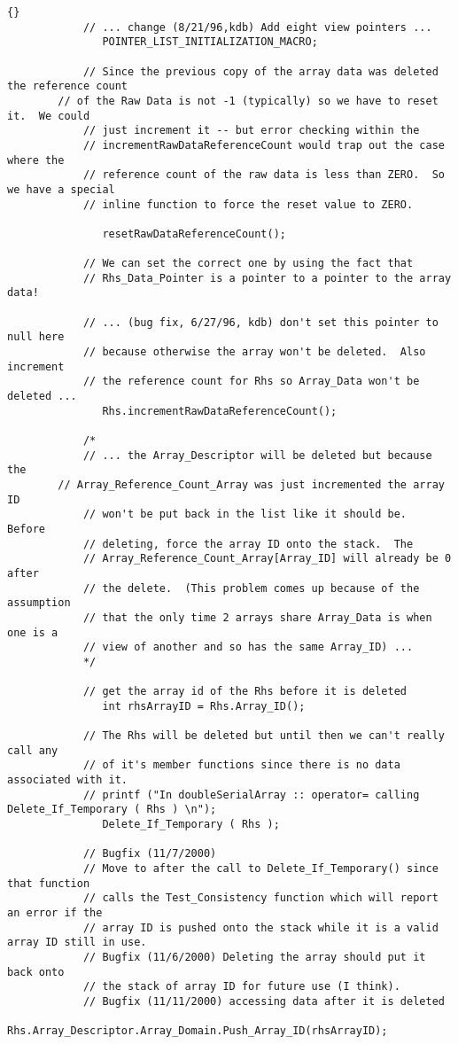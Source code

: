 \documentclass[10pt]{llncs}
\begin{document}
\begin{lstlisting}{}
            // ... change (8/21/96,kdb) Add eight view pointers ...
               POINTER_LIST_INITIALIZATION_MACRO;

            // Since the previous copy of the array data was deleted the reference count 
	    // of the Raw Data is not -1 (typically) so we have to reset it.  We could 
            // just increment it -- but error checking within the 
            // incrementRawDataReferenceCount would trap out the case where the
            // reference count of the raw data is less than ZERO.  So we have a special 
            // inline function to force the reset value to ZERO.

               resetRawDataReferenceCount();

            // We can set the correct one by using the fact that 
            // Rhs_Data_Pointer is a pointer to a pointer to the array data!

            // ... (bug fix, 6/27/96, kdb) don't set this pointer to null here
            // because otherwise the array won't be deleted.  Also increment
            // the reference count for Rhs so Array_Data won't be deleted ...
               Rhs.incrementRawDataReferenceCount();

            /*
            // ... the Array_Descriptor will be deleted but because the
	    // Array_Reference_Count_Array was just incremented the array ID
            // won't be put back in the list like it should be.  Before
            // deleting, force the array ID onto the stack.  The 
            // Array_Reference_Count_Array[Array_ID] will already be 0 after
            // the delete.  (This problem comes up because of the assumption
            // that the only time 2 arrays share Array_Data is when one is a
            // view of another and so has the same Array_ID) ...
            */

            // get the array id of the Rhs before it is deleted
               int rhsArrayID = Rhs.Array_ID();

            // The Rhs will be deleted but until then we can't really call any
            // of it's member functions since there is no data associated with it.
            // printf ("In doubleSerialArray :: operator= calling Delete_If_Temporary ( Rhs ) \n");
               Delete_If_Temporary ( Rhs );

            // Bugfix (11/7/2000) 
            // Move to after the call to Delete_If_Temporary() since that function 
            // calls the Test_Consistency function which will report an error if the 
            // array ID is pushed onto the stack while it is a valid array ID still in use.
            // Bugfix (11/6/2000) Deleting the array should put it back onto 
            // the stack of array ID for future use (I think).
            // Bugfix (11/11/2000) accessing data after it is deleted
               Rhs.Array_Descriptor.Array_Domain.Push_Array_ID(rhsArrayID);


\end{lstlisting}
\end{document}
